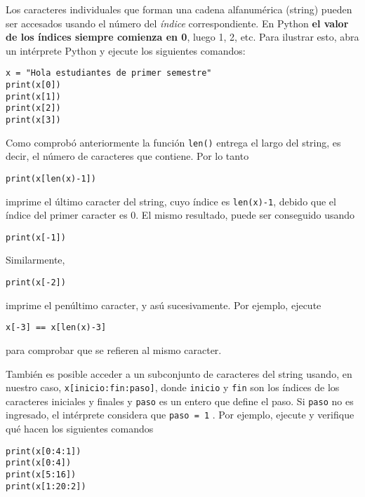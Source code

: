 \documentclass[11pt]{exam}
\begin{document}
\begin{questions}
\item Los caracteres individuales que forman una cadena alfanumérica (string) pueden ser accesados usando el número del \textit{índice} correspondiente. En Python \textbf{el valor de los índices siempre comienza en 0}, luego 1, 2, etc. Para ilustrar esto, abra un intérprete Python y ejecute los siguientes comandos:

\begin{verbatim}
x = "Hola estudiantes de primer semestre"
print(x[0])
print(x[1])
print(x[2])
print(x[3])
\end{verbatim}

\item Como comprobó anteriormente la función \texttt{len()} entrega el largo del string, es decir, el número de caracteres que contiene. Por lo tanto

\begin{verbatim}
print(x[len(x)-1])
\end{verbatim}

imprime el último caracter del string, cuyo índice es \texttt{len(x)-1}, debido que el índice del primer caracter es 0. El mismo resultado, puede ser conseguido usando

\begin{verbatim}
print(x[-1])
\end{verbatim}

Similarmente,

\begin{verbatim}
print(x[-2])
\end{verbatim}

imprime el penúltimo caracter, y asú sucesivamente. Por ejemplo, ejecute

\begin{verbatim}
x[-3] == x[len(x)-3]
\end{verbatim}

para comprobar que se refieren al mismo caracter.

\item También es posible acceder a un subconjunto de caracteres del string usando, en nuestro caso, \texttt{x[inicio:fin:paso]}, donde \texttt{inicio} y \texttt{fin} son los índices de los caracteres iniciales y finales y \texttt{paso} es un entero que define el paso. Si \texttt{paso} no es ingresado, el intérprete considera que \texttt{paso = 1} . Por ejemplo, ejecute y verifique qué hacen los siguientes comandos

\begin{verbatim}
print(x[0:4:1])
print(x[0:4])
print(x[5:16])
print(x[1:20:2])
\end{verbatim}


\end{questions}
\end{document}
